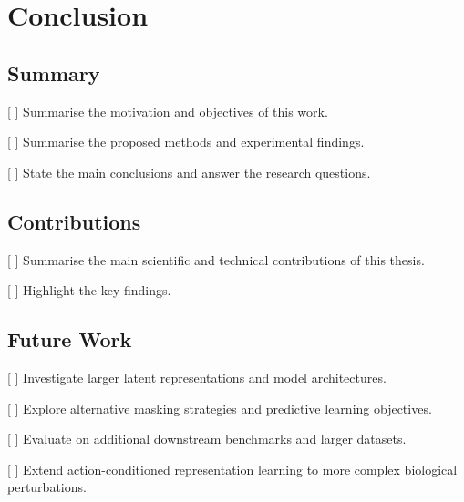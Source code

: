 \section{Conclusion}
\label{sec:conclusion}

\subsection{Summary}

[ ] Summarise the motivation and objectives of this work.

[ ] Summarise the proposed methods and experimental findings.

[ ] State the main conclusions and answer the research questions.

\subsection{Contributions}

[ ] Summarise the main scientific and technical contributions of this thesis.

[ ] Highlight the key findings.

\subsection{Future Work}

[ ] Investigate larger latent representations and model architectures.

[ ] Explore alternative masking strategies and predictive learning objectives.

[ ] Evaluate on additional downstream benchmarks and larger datasets.

[ ] Extend action-conditioned representation learning to more complex biological perturbations.